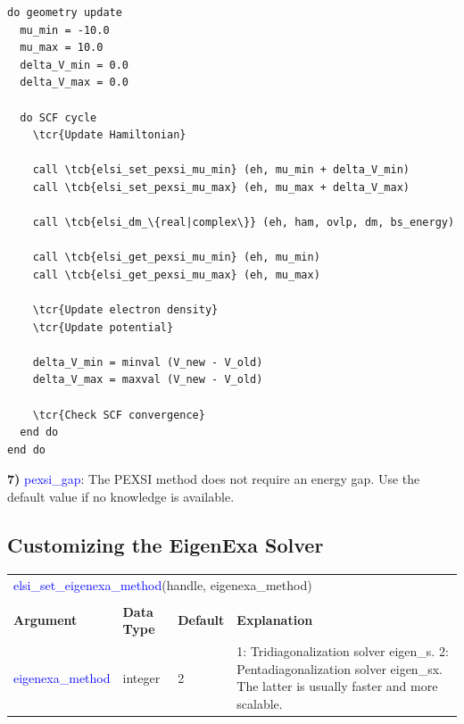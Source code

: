 \documentclass{report}
\newcommand{\tcb}[1]{\textcolor{blue}{#1}}
\newcommand{\tcr}[1]{\textcolor{red}{#1}}
\begin{document}
\begin{tcolorbox}
\begin{Verbatim}[commandchars=\\\{\}]
do geometry update
  mu_min = -10.0
  mu_max = 10.0
  delta_V_min = 0.0
  delta_V_max = 0.0

  do SCF cycle
    \tcr{Update Hamiltonian}

    call \tcb{elsi_set_pexsi_mu_min} (eh, mu_min + delta_V_min)
    call \tcb{elsi_set_pexsi_mu_max} (eh, mu_max + delta_V_max)

    call \tcb{elsi_dm_\{real|complex\}} (eh, ham, ovlp, dm, bs_energy)

    call \tcb{elsi_get_pexsi_mu_min} (eh, mu_min)
    call \tcb{elsi_get_pexsi_mu_max} (eh, mu_max)

    \tcr{Update electron density}
    \tcr{Update potential}

    delta_V_min = minval (V_new - V_old)
    delta_V_max = maxval (V_new - V_old)

    \tcr{Check SCF convergence}
  end do
end do
\end{Verbatim}
\end{tcolorbox}

\textbf{7)} \tcb{pexsi\_gap}: The PEXSI method does not require an energy gap. Use the default value if no knowledge is available.

\subsection{Customizing the EigenExa Solver}
\label{subsec:setter_eigenexa}
\begin{tabular}[]{|p{30mm}|p{20mm}|p{15mm}|p{100mm}|}
\multicolumn{4}{l}{\tcb{elsi\_set\_eigenexa\_method}(handle, eigenexa\_method)}\\
\multicolumn{4}{l}{}\\
\hline
\multicolumn{1}{|l|}{\textbf{Argument}} & \multicolumn{1}{l|}{\textbf{Data Type}} & \multicolumn{1}{l|}{\textbf{Default}} & \multicolumn{1}{l|}{\textbf{Explanation}}\\
\hline
\tcb{eigenexa\_method} & integer & 2 & 1: Tridiagonalization solver eigen\_s. 2: Pentadiagonalization solver eigen\_sx. The latter is usually faster and more scalable.\\
\hline
\end{tabular}
\end{document}
